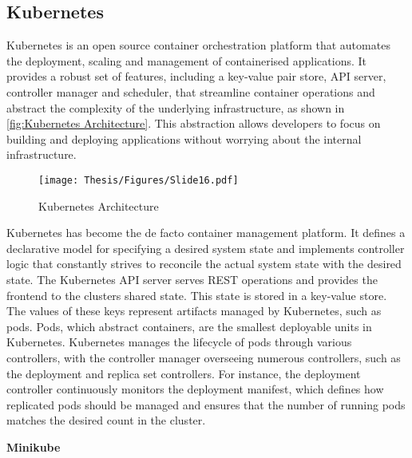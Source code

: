 \subsection{Kubernetes}

Kubernetes is an open source container orchestration platform that automates the deployment, scaling and management of containerised applications. It provides a robust set of features, including a key-value pair store, API server, controller manager and scheduler, that streamline container operations and abstract the complexity of the underlying infrastructure, as shown in \autoref{fig:Kubernetes Architecture}. This abstraction allows developers to focus on building and deploying applications without worrying about the internal infrastructure. \cite{r32}

\captionsetup{justification=centering}
\begin{figure}[h]
\centering
\texttt{[image: Thesis/Figures/Slide16.pdf]}
\caption{\label{fig:Kubernetes Architecture}Kubernetes Architecture \cite{r34}}
\end{figure}

Kubernetes has become the de facto container management platform. It defines a declarative model for specifying a desired system state and implements controller logic that constantly strives to reconcile the actual system state with the desired state. The Kubernetes API server serves REST operations and provides the frontend to the clusters shared state. This state is stored in a key-value store. The values of these keys represent artifacts managed by Kubernetes, such as pods. Pods, which abstract containers, are the smallest deployable units in Kubernetes. Kubernetes manages the lifecycle of pods through various controllers, with the controller manager overseeing numerous controllers, such as the deployment and replica set controllers. For instance, the deployment controller continuously monitors the deployment manifest, which defines how replicated pods should be managed and ensures that the number of running pods matches the desired count in the cluster. \cite{r34}




\textbf{Minikube}


